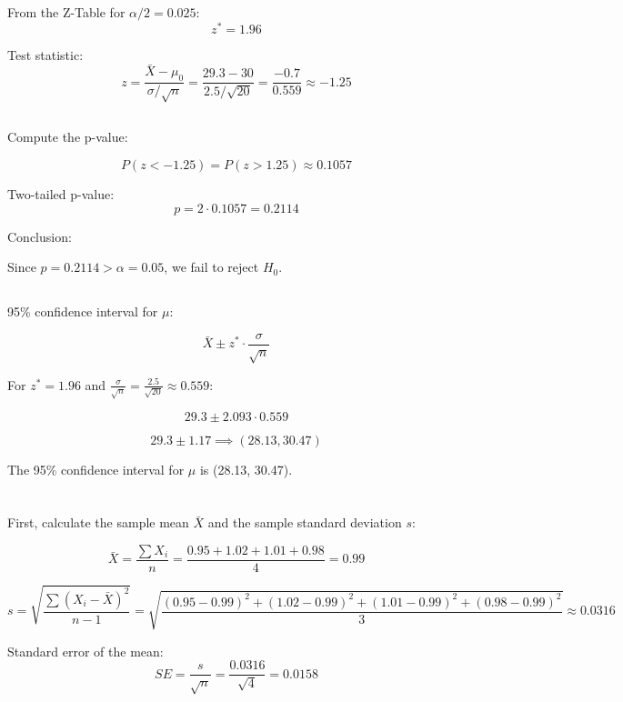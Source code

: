 \documentclass{homework}
\begin{document}
From the Z-Table for \( \alpha/2 = 0.025 \):
\[
z^* = 1.96
\]

Test statistic:
\[
z = \frac{\bar{X} - \mu_0}{\sigma / \sqrt{n}} = \frac{29.3 - 30}{2.5 / \sqrt{20}} = \frac{-0.7}{0.559} \approx -1.25
\]

\subsection{}

Compute the p-value:

\[
P(z < -1.25) = P(z > 1.25) \approx 0.1057
\]

Two-tailed p-value:
\[
p = 2 \cdot 0.1057 = 0.2114
\]

Conclusion:

Since \( p = 0.2114 > \alpha = 0.05 \), we fail to reject \( H_0 \).

\subsection{}

95\% confidence interval for \( \mu \):

\[
\bar{X} \pm z^* \cdot \frac{\sigma}{\sqrt{n}}
\]

For \( z^* = 1.96 \) and \( \frac{\sigma}{\sqrt{n}} = \frac{2.5}{\sqrt{20}} \approx 0.559 \):

\[
29.3 \pm 2.093 \cdot 0.559
\]

\[
29.3 \pm 1.17 \implies (28.13, 30.47)
\]

The 95\% confidence interval for \( \mu \) is (28.13, 30.47).

\section{}

\subsection{}

First, calculate the sample mean \( \bar{X} \) and the sample standard deviation \( s \):

\[
\bar{X} = \frac{\sum X_i}{n} = \frac{0.95 + 1.02 + 1.01 + 0.98}{4} = 0.99
\]

\[
s = \sqrt{\frac{\sum (X_i - \bar{X})^2}{n-1}} = \sqrt{\frac{(0.95 - 0.99)^2 + (1.02 - 0.99)^2 + (1.01 - 0.99)^2 + (0.98 - 0.99)^2}{3}} \approx 0.0316
\]

Standard error of the mean:
\[
SE = \frac{s}{\sqrt{n}} = \frac{0.0316}{\sqrt{4}} = 0.0158
\]
\end{document}
